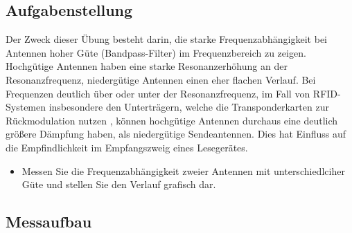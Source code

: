 \documentclass[12pt,a4paper,ngerman]{article}
\begin{document}
\subsection{Aufgabenstellung}
Der Zweck dieser Übung besteht darin, die starke Frequenzabhängigkeit bei Antennen hoher Güte (Bandpass-Filter) im Frequenzbereich zu zeigen. Hochgütige Antennen haben eine starke Resonanzerhöhung an der Resonanzfrequenz, niedergütige Antennen einen eher flachen Verlauf. Bei Frequenzen deutlich über oder unter der Resonanzfrequenz, im Fall von RFID-Systemen insbesondere den Unterträgern, welche die Transponderkarten zur Rückmodulation nutzen , können hochgütige Antennen durchaus eine deutlich größere Dämpfung haben, als niedergütige Sendeantennen. Dies hat Einfluss auf die Empfindlichkeit im Empfangszweig eines Lesegerätes.
\begin{itemize}
\item Messen Sie die Frequenzabhängigkeit zweier Antennen mit unterschiedlciher Güte und stellen Sie den Verlauf grafisch dar.
\end{itemize}


\subsection{Messaufbau}
\end{document}
